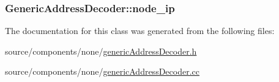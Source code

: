 \hypertarget{classGenericAddressDecoder_9b8fd8a1cc36e6ab4b398b2a9a4f74bd}{
\subsubsection[{node\_\-ip}]{ {\bf GenericAddressDecoder::node\_\-ip}}}
\label{classGenericAddressDecoder_9b8fd8a1cc36e6ab4b398b2a9a4f74bd}




The documentation for this class was generated from the following files:\begin{CompactItemize}
\item 
source/components/none/\hyperlink{genericAddressDecoder_8h}{genericAddressDecoder.h}\item 
source/components/none/\hyperlink{genericAddressDecoder_8cc}{genericAddressDecoder.cc}\end{CompactItemize}

